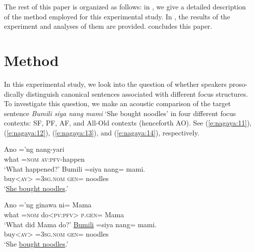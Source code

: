 \documentclass[output=paper]{langsci/langscibook}
\begin{document}
The rest of this paper is organized as follows: in , we give a detailed description of the method employed for this experimental study. In , the results of the experiment and analyses of them are provided.  concludes this paper.

\section{\label{s:nagaya:2}Method}

In this experimental study, we look into the question of whether  speakers proso-\linebreak dically distinguish canonical sentences associated with different focus structures. To investigate this question, we make an acoustic comparison of the target sentence \textit{Bumili siya nang mami} ‘She bought noodles’ in four different focus contexts: SF, PF, AF, and All-Old contexts (henceforth AO). See (\ref{e:nagaya:11}), (\ref{e:nagaya:12}), (\ref{e:nagaya:13}), and (\ref{e:nagaya:14}), respectively.

\begin{exe}
	\ex\label{e:nagaya:11}
	\begin{xlist}
		\gll Ano  =’ng  nang-yari{\USQMark}\\
		what  =\textsc{nom}  \textsc{av:pfv}-happen\\
		\glt ‘What happened?’
		\gll B{\USSmaller}um{\USGreater}ili =siya nang= mami.\\
		buy<\textsc{av}>  =3\textsc{sg.nom}  \textsc{gen}=  noodles\\
		\glt ‘\uline{She bought noodles}.’
	\end{xlist}
\end{exe}

\begin{exe}
	\ex\label{e:nagaya:12}
	\begin{xlist}
		\exi{Q:}  
		\gll Ano  =’ng  g{\USSmaller}in{\USGreater}awa  ni=    Mama{\USQMark}\\
		what  =\textsc{nom}  do<\textsc{pv:pfv}>  \textsc{p.gen}=  Mama\\
		\glt ‘What did Mama do?’
		\exi{A:}
		\gll \uline{B{\USSmaller}um{\USGreater}ili}  =siya nang=  mami\llap{\uline{\phantom{nang=  mami}}}.\\
		buy<\textsc{av}>  =3\textsc{sg.nom}  \textsc{gen}=  noodles\\
		\glt ‘She \uline{bought noodles}.’
	\end{xlist}
\end{exe}
\end{document}
